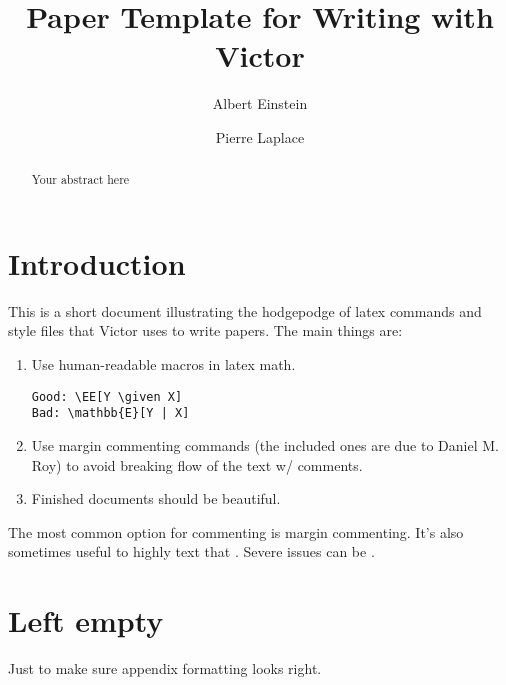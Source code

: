 \documentclass{article}
\title{Paper Template for Writing with Victor}
\date{}
\author[1]{Albert Einstein}
\author[1,2]{Pierre Laplace}
\affil[1]{Physical Insitute of the Beyond}
\affil[2]{Ouija Statistical Institute}
\begin{document}
\maketitle

\begin{abstract}
Your abstract here
\end{abstract}

\section{Introduction}

This is a short document illustrating the hodgepodge of latex commands and style files that Victor uses to write papers.
The main things are:
\begin{enumerate}
\item Use human-readable macros in latex math.
  
\begin{verbatim}
Good: \EE[Y \given X]
Bad: \mathbb{E}[Y | X]
\end{verbatim}
\item Use margin commenting commands (the included ones are due to Daniel M. Roy) to avoid breaking flow of the text w/ comments.
\item Finished documents should be beautiful.
\end{enumerate}

The most common option for commenting is margin commenting.
It's also sometimes useful to highly text that .
Severe issues can be .


\printbibliography

\newpage
\appendix


\section{Left empty}
Just to make sure appendix formatting looks right.
\end{document}
